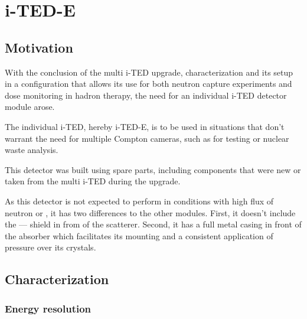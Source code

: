 \chapter{i-TED-E}\label{ch:e}

\section{Motivation}\label{sec:motivation-e}

With the conclusion of the multi \ac{i-TED} upgrade, characterization and its setup in a configuration that allows its use for both neutron capture experiments and dose monitoring in hadron therapy, the need for an individual \ac{i-TED} detector module arose.

The individual \ac{i-TED}, hereby \ac{i-TED}-E, is to be used in situations that don't warrant the need for multiple Compton cameras, such as for testing or nuclear waste analysis.

This detector was built using spare parts, including components that were new or taken from the multi \ac{i-TED} during the upgrade.

As this detector is not expected to perform in conditions with high flux of neutron or \gamma, it has two differences to the other modules. First, it doesn't include the --- shield in from of the scatterer. Second, it has a full metal casing in front of the absorber which facilitates its mounting and a consistent application of pressure over its crystals.

\section{Characterization}\label{sec:characterization-e}

\subsection{Energy resolution}

